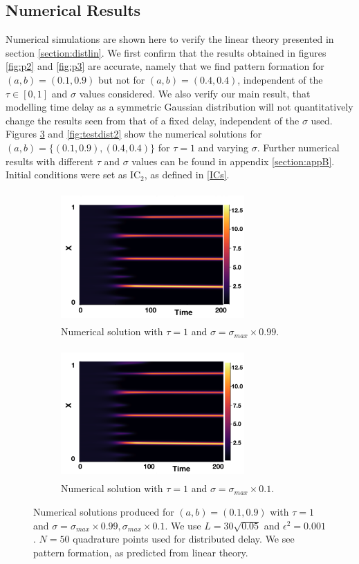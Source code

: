 \subsection{Numerical Results}\label{section:distsim}
Numerical simulations are shown here to verify the linear theory presented in section \ref{section:distlin}. We first confirm that the results obtained in figures \ref{fig:p2} and \ref{fig:p3} are accurate, namely that we find pattern formation for $(a,b)=(0.1,0.9)$ but not for $(a,b)=(0.4,0.4)$, independent of the $\tau\in[0,1]$ and $\sigma$ values considered. We also verify our main result, that modelling time delay as a symmetric Gaussian distribution will not quantitatively change the results seen from that of a fixed delay, independent of the $\sigma$ used. Figures \ref{fig:testdist1} and \ref{fig:testdist2} show the numerical solutions for $(a,b)=\{(0.1,0.9),(0.4,0.4)\}$ for $\tau=1$ and varying $\sigma$. Further numerical results with different $\tau$ and $\sigma$ values can be found in appendix \ref{section:appB}. Initial conditions were set as $\text{IC}_2$, as defined in \eqref{ICs}.

\begin{figure}[H]
    \centering
    \begin{subfigure}[b]{0.45\textwidth}
        \centering
        \includegraphics[width=7cm,height=5cm]{distp1sig1.png}
        \caption{Numerical solution with $\tau=1$ and $\sigma=\sigma_{max}\times0.99$.}
        \label{}
    \end{subfigure}
    \hfill
    \begin{subfigure}[b]{0.45\textwidth}
        \centering
        \includegraphics[width=7cm,height=5cm]{distp1sig2.png}
        \caption{Numerical solution with $\tau=1$ and $\sigma=\sigma_{max}\times0.1$.}
        \label{}
    \end{subfigure}
    \caption{Numerical solutions produced for $(a,b)=(0.1,0.9)$ with $\tau=1$ and $\sigma=\sigma_{max}\times0.99, \sigma_{max}\times0.1$. We use $L=30\sqrt{0.05}$ and $\epsilon^2=0.001$. $N=50$ quadrature points used for distributed delay.
    We see pattern formation, as predicted from linear theory.}
    \label{fig:testdist1}
\end{figure}

